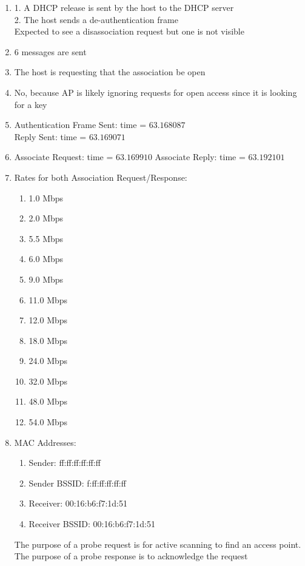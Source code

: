 \documentclass[11pt]{article}
\begin{document}
\begin{enumerate}[label=(\alph*)]
{	IP of Host Sending: 128.199.245.12 (corresponds to gaia.cs.umass.edu) \\
	Destination IP: 192.168.1.109 (corresponds to the wireless PC)
}
\item  {
	1. A DHCP release is sent by the host to the DHCP server \\
	2. The host sends a de-authentication frame \\
	
	Expected to see a disassociation request but one is not visible
}
\item  {
	6 messages are sent
}
\item  {
	The host is requesting that the association be open
}
\item  {
	No, because AP is likely ignoring requests for open access since it is looking for a key
}
\item  {
	Authentication Frame Sent: time = $63.168087$ \\
	Reply Sent: time = $63.169071$
}
\item  {
	Associate Request: time = $63.169910$
	Associate Reply: time = $63.192101$
}
\item  {
	Rates for both Association Request/Response:
	\begin{enumerate}
		\item 1.0 Mbps
		\item 2.0 Mbps
		\item 5.5 Mbps
		\item 6.0 Mbps
		\item 9.0 Mbps
		\item 11.0 Mbps
		\item 12.0 Mbps
		\item 18.0 Mbps
		\item 24.0 Mbps
		\item 32.0 Mbps
		\item 48.0 Mbps
		\item 54.0 Mbps
	\end{enumerate}
}
\item  {
	MAC Addresses:
	\begin{enumerate}
		\item Sender:  ff:ff:ff:ff:ff:ff
		\item Sender BSSID: f:ff:ff:ff:ff:ff
		\item Receiver: 00:16:b6:f7:1d:51
		\item Receiver BSSID: 00:16:b6:f7:1d:51
	\end{enumerate}
	
	The purpose of a probe request is for active scanning to find an access point. 
	The purpose of a probe response is to acknowledge the request
}
\end{enumerate}
\end{document}
